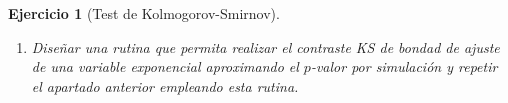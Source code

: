 \documentclass[
]{book}
\newenvironment{Shaded}{\begin{snugshade}}{\end{snugshade}}
\newcommand{\AttributeTok}[1]{\textcolor[rgb]{0.77,0.63,0.00}{#1}}
\newcommand{\CommentTok}[1]{\textcolor[rgb]{0.56,0.35,0.01}{\textit{#1}}}
\newcommand{\DecValTok}[1]{\textcolor[rgb]{0.00,0.00,0.81}{#1}}
\newcommand{\FunctionTok}[1]{\textcolor[rgb]{0.00,0.00,0.00}{#1}}
\newcommand{\NormalTok}[1]{#1}
\newcommand{\StringTok}[1]{\textcolor[rgb]{0.31,0.60,0.02}{#1}}
\theoremstyle{break}
\newtheorem{exercise}{Ejercicio}[chapter]
\theoremstyle{nonumberplain}
\renewcommand{\CommentTok}[1]{\textcolor[rgb]{0.41,0.41,0.41}{\texttt{#1}}}
\begin{document}
\begin{exercise}[Test de Kolmogorov-Smirnov]
\begin{enumerate}
  \begin{center}\texttt{[image: 07-Monte\_Carlo\_files/figure-latex/unnamed-chunk-56-1]} \end{center}

\begin{Shaded}
\begin{Highlighting}[]
\CommentTok{\# Distribución empírica}
\FunctionTok{curve}\NormalTok{(}\FunctionTok{ecdf}\NormalTok{(pvalor)(x), }\AttributeTok{type =} \StringTok{"s"}\NormalTok{, }\AttributeTok{lwd =} \DecValTok{2}\NormalTok{, }
      \AttributeTok{main =} \StringTok{\textquotesingle{}Tamaño del contraste\textquotesingle{}}\NormalTok{, }\AttributeTok{ylab =} \StringTok{\textquotesingle{}Proporción de rechazos\textquotesingle{}}\NormalTok{, }
      \AttributeTok{xlab =} \StringTok{\textquotesingle{}Nivel de significación\textquotesingle{}}\NormalTok{)}
\FunctionTok{abline}\NormalTok{(}\AttributeTok{a=}\DecValTok{0}\NormalTok{, }\AttributeTok{b=}\DecValTok{1}\NormalTok{, }\AttributeTok{lty=}\DecValTok{2}\NormalTok{)   }\CommentTok{\# curve(punif(x, 0, 1), add = TRUE) }
\end{Highlighting}
\end{Shaded}

  \begin{center}\texttt{[image: 07-Monte\_Carlo\_files/figure-latex/unnamed-chunk-56-2]} \end{center}
\item
  Diseñar una rutina que permita realizar el contraste KS de
  bondad de ajuste de una variable exponencial aproximando el
  \(p\)-valor por simulación y repetir el apartado anterior
  empleando esta rutina.


\end{enumerate}
\end{exercise}
\end{document}
